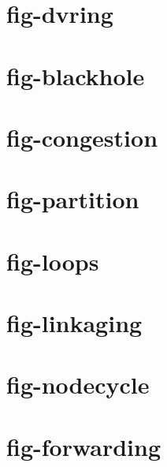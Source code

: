 \documentclass[11pt]{article}
\begin{document}
\section*{fig-dvring}\par\vspace{1cm}
\section*{fig-blackhole}\par\vspace{1cm}
\section*{fig-congestion}\par\vspace{1cm}
\section*{fig-partition}\par\vspace{1cm}
\section*{fig-loops}\par\vspace{1cm}
\section*{fig-linkaging}\par\vspace{1cm}
\section*{fig-nodecycle}\par\vspace{1cm}
\section*{fig-forwarding}
\end{document}
